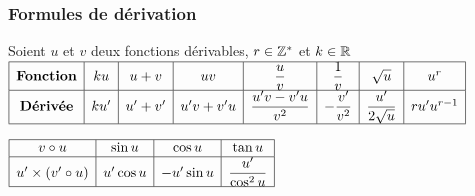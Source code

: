 \subsubsection*{Formules de dérivation}
Soient $u $ et $v $ deux fonctions dérivables, $ r\in\mathbb{Z}^* $ et $ k\in\mathbb{R} $\\

$\begin{array}{|c|c|c|c|c|c|c|c|}
\hline 
\textbf{Fonction} & ku & u+v & uv & \dfrac{u}{v} & \dfrac{1}{v} & \sqrt{u} & u^{r} \\     
\hline 
\textbf{Dérivée} & ku' & u'+v' & u'v+ v'u & \dfrac{u'v- v'u}{v^{2}} & -\dfrac{v'}{v^{2}} & \dfrac{u'}{2\sqrt{u}} & ru'u^{r-1} \\    
\hline
\end{array}$

\bigskip

$\begin{array}{|c|c|c|c|}
\hline
   v\circ u  &  \sin u  &  \cos u  & \tan u \\
\hline
 u'\times (v'\circ u)   &  u'\cos u  & -u'\sin u &  \dfrac{u'}{\cos^{2}u}\\     
 \hline
\end{array}$



